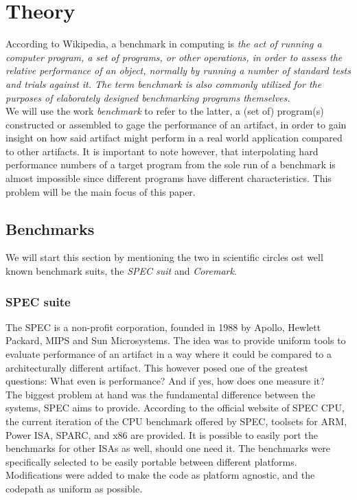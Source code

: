 \documentclass[../bachelor_paper.tex]{subfiles}
\begin{document}
\chapter{Theory}
    \label{ch:theory}

According to Wikipedia, a benchmark in computing is \emph{the act of running a computer program, a set of programs, or other operations, in order to assess the relative performance of an object, normally by running a number of standard tests and trials against it. The term benchmark is also commonly utilized for the purposes of elaborately designed benchmarking programs themselves.} \cite{BenchmarkComputing2021} \\
We will use the work \emph{benchmark} to refer to the latter, a (set of) program(s) constructed or assembled to gage the performance of an artifact, in order to gain insight on how said artifact might perform in a real world application compared to other artifacts. It is important to note however, that interpolating hard performance numbers of a target program from the sole run of a benchmark is almost impossible since different programs have different characteristics. This problem will be the main focus of this paper.\\

\section*{Benchmarks}
We will start this section by mentioning the two in scientific circles ost well known benchmark suits, the \emph{SPEC suit} and \emph{Coremark}.

\subsection*{SPEC suite}
The \ac{SPEC} is a non-profit corporation, founded in 1988 by Apollo, Hewlett Packard, MIPS and Sun Microsystems. \cite{dixitSPECBenchmarks1991} The idea was to provide uniform tools to evaluate performance of an artifact in a way where it could be compared to a architecturally different artifact. This however posed one of the greatest questions: What even is performance? And  if yes, how does one measure it?\\
The biggest problem at hand was the fundamental difference between the systems, \ac{SPEC} aims to provide. According to the official website of \ac{SPEC} CPU, the current iteration of the CPU benchmark offered by \ac{SPEC}, toolsets for ARM, Power ISA, SPARC, and x86 are provided. It is possible to easily port the benchmarks for other \ac{ISA}s as well, should one need it. The benchmarks were specifically selected to be easily portable between different platforms. Modifications were added to make the code as platform agnostic, and the codepath as uniform as possible.
\end{document}
